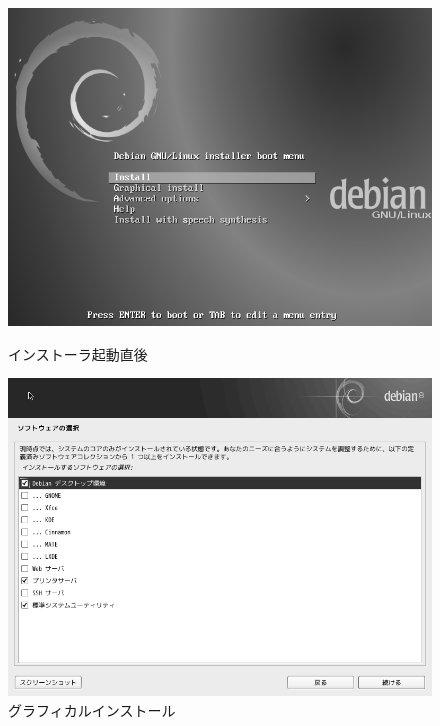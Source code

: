 \documentclass[mingoth,a4paper]{jsarticle}
\begin{document}
\begin{figure}[htbp]
\begin{minipage}{0.5\hsize}
 \begin{center}
  \includegraphics[width=0.8\hsize]{image201509/debian8-inst-01_mono.png}
 \end{center}
 \caption{インストーラ起動直後}
\end{minipage}
 \begin{minipage}{0.5\hsize}
  \begin{center}
   \includegraphics[width=0.8\hsize]{image201509/debian8-inst-02_mono.png}
  \end{center}
  \caption{グラフィカルインストール}
 \end{minipage}
\end{figure}
\end{document}
